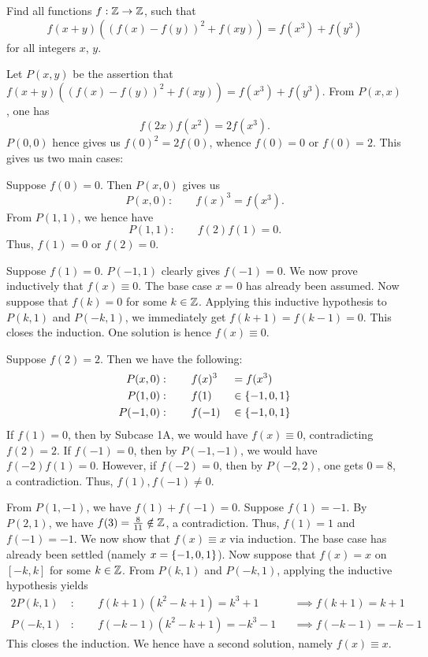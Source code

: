 \begin{question}\label{Q::2023-O-2-4}
    Find all functions $f : \mathbb{Z} \to \mathbb{Z}$, such that \[f(x+y)((f(x) - f(y))^2 + f(xy)) = f(x^3) + f(y^3)\] for all integers $x$, $y$.
\end{question}
\begin{solution*}
    Let $P(x, y)$ be the assertion that $f(x+y)((f(x) - f(y))^2 + f(xy)) = f(x^3) + f(y^3)$. From $P(x, x)$, one has \[f(2x)f(x^2) = 2f(x^3).\] $P(0, 0)$ hence gives us $f(0)^2 = 2f(0)$, whence $f(0) = 0$ or $f(0) = 2$. This gives us two main cases:

     Suppose $f(0) = 0$. Then $P(x, 0)$ gives us \[P(x, 0) : \qquad f(x)^3 = f(x^3).\] From $P(1, 1)$, we hence have \[P(1, 1) : \qquad f(2)f(1) = 0.\] Thus, $f(1) = 0$ or $f(2) = 0$.

     Suppose $f(1) = 0$. $P(-1, 1)$ clearly gives $f(-1) = 0$. We now prove inductively that $f(x) \equiv 0$. The base case $x = 0$ has already been assumed. Now suppose that $f(k) = 0$ for some $k \in \mathbb{Z}$. Applying this inductive hypothesis to $P(k, 1)$ and $P(-k, 1)$, we immediately get $f(k + 1) = f(k - 1) = 0$. This closes the induction. One solution is hence $f(x) \equiv 0$.

     Suppose $f(2) = 2$. Then we have the following:
    \begin{alignat*}{2}
        P(x, 0) &: \qquad f(x)^3 &&= f(x^3)\\
        P(1, 0) &: \qquad f(1) &&\in \left\lbrace -1, 0, 1 \right\rbrace\\
        P(-1, 0) &: \qquad f(-1) &&\in \left\lbrace -1, 0, 1 \right\rbrace
    \end{alignat*} 
    If $f(1) = 0$, then by Subcase 1A, we would have $f(x) \equiv 0$, contradicting $f(2) = 2$. If $f(-1) = 0$, then by $P(-1, -1)$, we would have $f(-2)f(1) = 0$. However, if $f(-2) = 0$, then by $P(-2, 2)$, one gets $0 = 8$, a contradiction. Thus, $f(1), f(-1) \neq 0$.

    From $P(1, -1)$, we have $f(1) + f(-1) = 0$. Suppose $f(1) = -1$. By $P(2, 1)$, we have $f(3) = \frac8{11} \notin \mathbb{Z}$, a contradiction. Thus, $f(1) = 1$ and $f(-1) = -1$. We now show that $f(x) \equiv x$ via induction. The base case has already been settled (namely $x = \left\lbrace -1, 0, 1 \right\rbrace$). Now suppose that $f(x) = x$ on $[-k, k]$ for some $k \in \mathbb{Z}$. From $P(k, 1)$ and $P(-k, 1)$, applying the inductive hypothesis yields
    \begin{alignat*}{2}
        P(k, 1) &: \qquad f(k+1)(k^2 - k + 1) = k^3 + 1 &&\implies f(k+1) = k+1\\
        P(-k, 1) &: \qquad f(-k-1)(k^2 - k + 1) = -k^3 -1 &&\implies f(-k-1) = -k-1
    \end{alignat*}
    This closes the induction. We hence have a second solution, namely $f(x) \equiv x$.


\end{solution*}
